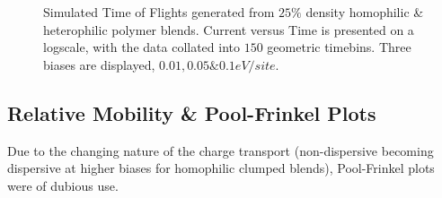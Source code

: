 \documentclass[twocolumn,a4,notitlepage]{report}
\begin{document}
\begin{figure}[htb]
\centering
{}
\caption{Simulated Time of Flights generated from $25\%$ density homophilic
\& heterophilic polymer blends. Current versus Time is presented on a
logscale, with the data collated into $150$ geometric timebins. Three biases
are displayed, $0.01, 0.05 \& 0.1 eV/site$.
}
\label{tofs}
\end{figure}

\subsection{Relative Mobility \& Pool-Frinkel Plots}

Due to the changing nature of the charge transport (non-dispersive becoming
dispersive at higher biases for homophilic clumped blends), Pool-Frinkel 
plots were of dubious use.
\end{document}
